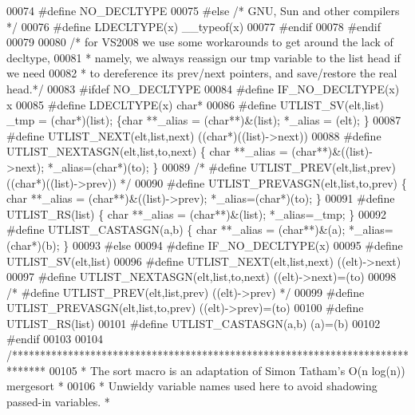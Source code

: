 \begin{DoxyCode}
00074 \textcolor{preprocessor}{#define NO\_DECLTYPE}
00075 \textcolor{preprocessor}{#else                   }\textcolor{comment}{/* GNU, Sun and other compilers */}\textcolor{preprocessor}{}
00076 \textcolor{preprocessor}{#define LDECLTYPE(x) \_\_typeof(x)}
00077 \textcolor{preprocessor}{#endif}
00078 \textcolor{preprocessor}{#endif}
00079 
00080 \textcolor{comment}{/* for VS2008 we use some workarounds to get around the lack of decltype,}
00081 \textcolor{comment}{ * namely, we always reassign our tmp variable to the list head if we need}
00082 \textcolor{comment}{ * to dereference its prev/next pointers, and save/restore the real head.*/}
00083 \textcolor{preprocessor}{#ifdef NO\_DECLTYPE}
00084 \textcolor{preprocessor}{#define IF\_NO\_DECLTYPE(x) x}
00085 \textcolor{preprocessor}{#define LDECLTYPE(x) char*}
00086 \textcolor{preprocessor}{#define UTLIST\_SV(elt,list) \_tmp = (char*)(list); \{char **\_alias = (char**)&(list); *\_alias = (elt); \}}
00087 \textcolor{preprocessor}{#define UTLIST\_NEXT(elt,list,next) ((char*)((list)->next))}
00088 \textcolor{preprocessor}{#define UTLIST\_NEXTASGN(elt,list,to,next) \{ char **\_alias = (char**)&((list)->next); *\_alias=(char*)(to); \}}
00089 \textcolor{comment}{/* #define UTLIST\_PREV(elt,list,prev) ((char*)((list)->prev)) */}
00090 \textcolor{preprocessor}{#define UTLIST\_PREVASGN(elt,list,to,prev) \{ char **\_alias = (char**)&((list)->prev); *\_alias=(char*)(to); \}}
00091 \textcolor{preprocessor}{#define UTLIST\_RS(list) \{ char **\_alias = (char**)&(list); *\_alias=\_tmp; \}}
00092 \textcolor{preprocessor}{#define UTLIST\_CASTASGN(a,b) \{ char **\_alias = (char**)&(a); *\_alias=(char*)(b); \}}
00093 \textcolor{preprocessor}{#else}
00094 \textcolor{preprocessor}{#define IF\_NO\_DECLTYPE(x)}
00095 \textcolor{preprocessor}{#define UTLIST\_SV(elt,list)}
00096 \textcolor{preprocessor}{#define UTLIST\_NEXT(elt,list,next) ((elt)->next)}
00097 \textcolor{preprocessor}{#define UTLIST\_NEXTASGN(elt,list,to,next) ((elt)->next)=(to)}
00098 \textcolor{comment}{/* #define UTLIST\_PREV(elt,list,prev) ((elt)->prev) */}
00099 \textcolor{preprocessor}{#define UTLIST\_PREVASGN(elt,list,to,prev) ((elt)->prev)=(to)}
00100 \textcolor{preprocessor}{#define UTLIST\_RS(list)}
00101 \textcolor{preprocessor}{#define UTLIST\_CASTASGN(a,b) (a)=(b)}
00102 \textcolor{preprocessor}{#endif}
00103 
00104 \textcolor{comment}{/******************************************************************************}
00105 \textcolor{comment}{ * The sort macro is an adaptation of Simon Tatham's O(n log(n)) mergesort    *}
00106 \textcolor{comment}{ * Unwieldy variable names used here to avoid shadowing passed-in variables.  *}

\end{DoxyCode}
